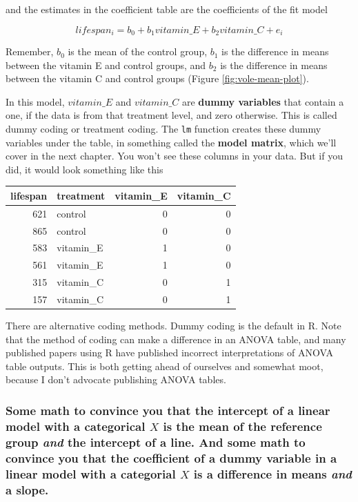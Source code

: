 \documentclass[]{book}
\theoremstyle{definition}
\theoremstyle{definition}
\theoremstyle{definition}
\theoremstyle{remark}
\begin{document}
and the estimates in the coefficient table are the coefficients of the
fit model

\begin{equation}
lifespan_i = b_0 + b_1 vitamin\_E + b_2 vitamin\_C + e_i
\label{eq:model-cat-x}
\end{equation}

Remember, \(b_0\) is the mean of the control group, \(b_1\) is the
difference in means between the vitamin E and control groups, and
\(b_2\) is the difference in means between the vitamin C and control
groups (Figure \ref{fig:vole-mean-plot}).

In this model, \(vitamin\_E\) and \(vitamin\_C\) are \textbf{dummy
variables} that contain a one, if the data is from that treatment level,
and zero otherwise. This is called dummy coding or treatment coding. The
\texttt{lm} function creates these dummy variables under the table, in
something called the \textbf{model matrix}, which we'll cover in the
next chapter. You won't see these columns in your data. But if you did,
it would look something like this

\begin{tabular}{r|l|r|r}
\hline
lifespan & treatment & vitamin\_E & vitamin\_C\\
\hline
621 & control & 0 & 0\\
\hline
865 & control & 0 & 0\\
\hline
583 & vitamin\_E & 1 & 0\\
\hline
561 & vitamin\_E & 1 & 0\\
\hline
315 & vitamin\_C & 0 & 1\\
\hline
157 & vitamin\_C & 0 & 1\\
\hline
\end{tabular}

There are alternative coding methods. Dummy coding is the default in R.
Note that the method of coding can make a difference in an ANOVA table,
and many published papers using R have published incorrect
interpretations of ANOVA table outputs. This is both getting ahead of
ourselves and somewhat moot, because I don't advocate publishing ANOVA
tables.

\subsubsection{\texorpdfstring{Some math to convince you that the
intercept of a linear model with a categorical \(X\) is the mean of the
reference group \emph{and} the intercept of a line. And some math to
convince you that the coefficient of a dummy variable in a linear model
with a categorial \(X\) is a difference in means \emph{and} a
slope.}{Some math to convince you that the intercept of a linear model with a categorical X is the mean of the reference group and the intercept of a line. And some math to convince you that the coefficient of a dummy variable in a linear model with a categorial X is a difference in means and a slope.}}\label{some-math-to-convince-you-that-the-intercept-of-a-linear-model-with-a-categorical-x-is-the-mean-of-the-reference-group-and-the-intercept-of-a-line.-and-some-math-to-convince-you-that-the-coefficient-of-a-dummy-variable-in-a-linear-model-with-a-categorial-x-is-a-difference-in-means-and-a-slope.}
\end{document}
